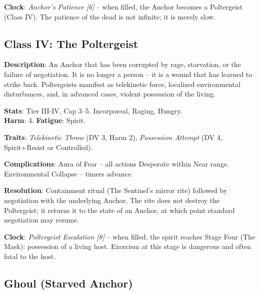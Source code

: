 \noindent\textbf{Clock}: \emph{Anchor's Patience [6]} -- when filled, the Anchor becomes a Poltergeist (Class IV). The patience of the dead is not infinite; it is merely slow.


\subsection*{Class IV: The Poltergeist}

\noindent\textbf{Description}: An Anchor that has been corrupted by rage, starvation, or the failure of negotiation. It is no longer a person -- it is a wound that has learned to strike back. Poltergeists manifest as telekinetic force, localized environmental disturbances, and, in advanced cases, violent possession of the living.

\noindent\textbf{Stats}: Tier III-IV, Cap 3--5. Incorporeal, Raging, Hungry.\\
\textbf{Harm}: 4. \textbf{Fatigue}: Spirit.

\noindent\textbf{Traits}: 
\emph{Telekinetic Throw} (DV 3, Harm 2), \emph{Possession Attempt} (DV 4, Spirit+Resist or Controlled).

\noindent\textbf{Complications}: Aura of Fear -- all actions Desperate within Near range. Environmental Collapse -- timers advance.

\noindent\textbf{Resolution}: Containment ritual (The Sentinel's mirror rite) followed by negotiation with the underlying Anchor. The rite does not destroy the Poltergeist; it returns it to the state of an Anchor, at which point standard negotiation may resume.

\noindent\textbf{Clock}: \emph{Poltergeist Escalation [8]} -- when filled, the spirit reaches Stage Four (The Mask): possession of a living host. Exorcism at this stage is dangerous and often fatal to the host.


\subsection*{Ghoul (Starved Anchor)}

